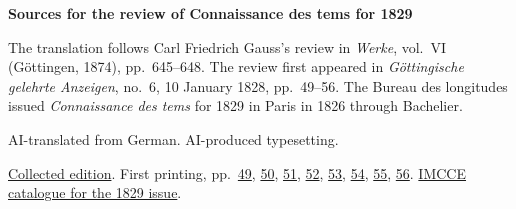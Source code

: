 \clearpage\thispagestyle{empty}
\begin{center}\Large\bfseries Sources for the review of Connaissance des tems for 1829\end{center}

The translation follows Carl Friedrich Gauss’s review in \emph{Werke}, vol.~VI (Göttingen, 1874), pp.~645--648. The review first appeared in \emph{Göttingische gelehrte Anzeigen}, no.~6, 10 January 1828, pp.~49--56. The Bureau des longitudes issued \emph{Connaissance des tems} for 1829 in Paris in 1826 through Bachelier.

AI-translated from German. AI-produced typesetting.

\href{https://gdz.sub.uni-goettingen.de/id/PPN236007467}{Collected edition}. First printing, pp.~\href{https://images.p.sub.uni-goettingen.de/iiif/image/gdz:PPN385030444_1828_1:00000051/full/1650,/0/default.jpg}{49}, \href{https://images.p.sub.uni-goettingen.de/iiif/image/gdz:PPN385030444_1828_1:00000052/full/1650,/0/default.jpg}{50}, \href{https://images.p.sub.uni-goettingen.de/iiif/image/gdz:PPN385030444_1828_1:00000053/full/1650,/0/default.jpg}{51}, \href{https://images.p.sub.uni-goettingen.de/iiif/image/gdz:PPN385030444_1828_1:00000054/full/1650,/0/default.jpg}{52}, \href{https://images.p.sub.uni-goettingen.de/iiif/image/gdz:PPN385030444_1828_1:00000055/full/1650,/0/default.jpg}{53}, \href{https://images.p.sub.uni-goettingen.de/iiif/image/gdz:PPN385030444_1828_1:00000056/full/1650,/0/default.jpg}{54}, \href{https://images.p.sub.uni-goettingen.de/iiif/image/gdz:PPN385030444_1828_1:00000057/full/1650,/0/default.jpg}{55}, \href{https://images.p.sub.uni-goettingen.de/iiif/image/gdz:PPN385030444_1828_1:00000058/full/1650,/0/default.jpg}{56}. \href{https://cdt.imcce.fr/items/show/178}{IMCCE catalogue for the 1829 issue}.

\clearpage
